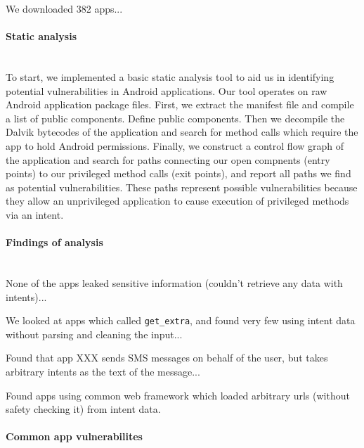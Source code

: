 \documentclass[12pt,a4paper]{article}
\begin{document}
We downloaded 382 apps...

\paragraph{Static analysis} ~\\

To start, we implemented a basic static analysis tool to aid us in identifying
potential vulnerabilities in Android applications. Our tool operates on raw Android
application package files. First, we extract the manifest file and compile a
list of public components. Define public components. Then we decompile the
Dalvik bytecodes of the application and search for method calls which require
the app to hold Android permissions. Finally, we construct a control flow graph
of the application and search for paths connecting our open compnents (entry
points) to our privileged method calls (exit points), and report all paths we
find as potential vulnerabilities. These paths represent possible
vulnerabilities because they allow an unprivileged application to cause
execution of privileged methods via an intent.

\paragraph{Findings of analysis} ~\\

None of the apps leaked sensitive information (couldn't retrieve any data with
intents)...

We looked at apps which called \texttt{get_extra}, and found very few using
intent data without parsing and cleaning the input...

Found that app XXX sends SMS messages on behalf of the user, but takes arbitrary
intents as the text of the message...

Found apps using common web framework which loaded arbitrary urls (without
safety checking it) from intent data.

\paragraph{Common app vulnerabilites} ~\\
\end{document}
